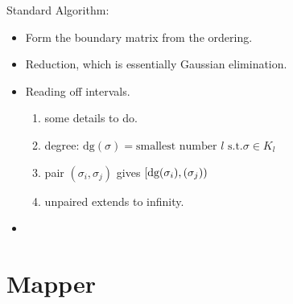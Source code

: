 \documentclass[10pt,a4paper]{report}
\begin{document}
Standard Algorithm:
\begin{itemize}
	\item Form the boundary matrix from the ordering.
	\item Reduction, which is essentially Gaussian elimination.
	\item Reading off intervals.
	\begin{enumerate}
		\item some details to do.
		\item degree: $\text{dg}(\sigma)=\text{smallest number }l\text{ s.t.}\sigma\in K_l$
		\item pair $(\sigma_i,\sigma_j)$ gives $[\text{dg}(\sigma_i),\text(\sigma_j))$
		\item unpaired extends to infinity.
	\end{enumerate}
	\item 
\end{itemize}

\section{Mapper}



\newpage


\end{document}
